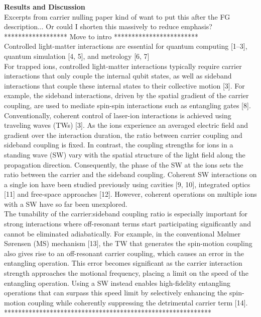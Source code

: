 \documentclass{article}
\begin{document}

\textbf{Results and Discussion}\\

    Excerpts from carrier nulling paper kind of want to put this after the FG description... Or could I shorten this massively to reduce emphasis?\\

    ******************  Move to intro  ************************\\
    Controlled light-matter interactions are essential for quantum
    computing [1–3], quantum simulation [4, 5], and metrology [6,
      7]\\

    For trapped ions, controlled light-matter interactions typically require
    carrier interactions that only couple the internal qubit states,
    as well as sideband interactions that couple these internal states
    to their collective motion [3]. For example, the sideband
    interactions, driven by the spatial gradient of the carrier
    coupling, are used to mediate spin-spin interactions such as
    entangling gates [8]. Conventionally, coherent control of
    laser-ion interactions is achieved using traveling waves (TWs)
    [3]. As the ions experience an averaged electric field and
    gradient over the interaction duration, the ratio between carrier
    coupling and sideband coupling is fixed. In contrast, the coupling
    strengths for ions in a standing wave (SW) vary with the spatial
    structure of the light field along the propagation
    direction. Consequently, the phase of the SW at the ions sets the
    ratio between the carrier and the sideband coupling. Coherent SW
    interactions on a single ion have been studied previously using
    cavities [9, 10], integrated optics [11] and free-space approaches
    [12]. However, coherent operations on multiple ions with a SW have
    so far been unexplored.\\

    The tunability of the carrier:sideband coupling ratio is especially
    important for strong interactions where off-resonant terms start
    participating significantly and cannot be eliminated
    adiabatically. For example, in the conventional Mølmer Sørensen (MS)
    mechanism [13], the TW that generates the spin-motion coupling also
    gives rise to an off-resonant carrier coupling, which causes an error
    in the entangling operation. This error becomes significant as the
    carrier interaction strength approaches the motional frequency,
    placing a limit on the speed of the entangling operation. Using a SW
    instead enables high-fidelity entangling operations that can surpass
    this speed limit by selectively enhancing the spin-motion coupling
    while coherently suppressing the detrimental carrier term [14].\\
    ***********************************************************\\
    
\end{document}
